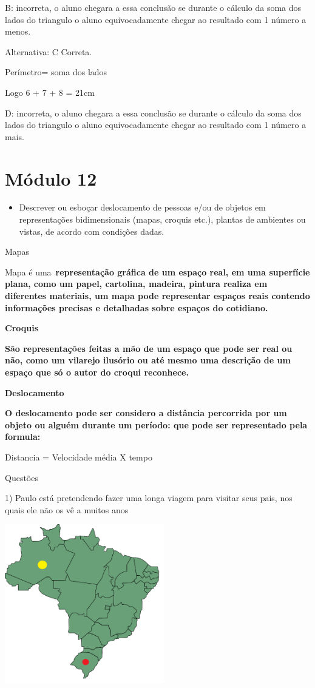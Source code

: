 B: incorreta, o aluno chegara a essa conclusão se durante o cálculo da
soma dos lados do triangulo o aluno equivocadamente chegar ao resultado
com 1 número a menos.

Alternativa: C Correta.

Perímetro= soma dos lados

Logo 6 + 7 + 8 = 21cm

D: incorreta, o aluno chegara a essa conclusão se durante o cálculo da
soma dos lados do triangulo o aluno equivocadamente chegar ao resultado
com 1 número a mais.

\section{Módulo 12}

\begin{itemize}
\tightlist
\item
  Descrever ou esboçar deslocamento de pessoas e/ou de objetos em
  representações bidimensionais (mapas, croquis etc.), plantas de
  ambientes ou vistas, de acordo com condições dadas.
\end{itemize}

Mapas

Mapa é uma~\textbf{representação gráfica de um espaço real, em uma
superfície plana, como um papel, cartolina, madeira, pintura realiza em
diferentes materiais, um mapa pode representar espaços reais contendo
informações precisas e detalhadas sobre espaços do cotidiano.}

\textbf{Croquis}

\textbf{São representações feitas a mão de um espaço que pode ser real
ou não, como um vilarejo ilusório ou até mesmo uma descrição de um
espaço que só o autor do croqui reconhece.}

\textbf{Deslocamento}

\textbf{O deslocamento pode ser considero a distância percorrida por um
objeto ou alguém durante um período: que pode ser representado pela
formula:}

Distancia = Velocidade média X tempo

Questões

1) Paulo está pretendendo fazer uma longa viagem para visitar seus pais,
nos quais ele não os vê a muitos anos

\includegraphics[width=2.73952in,height=2.725in]{./imgSAEB_8_MAT/media/image36.png}

